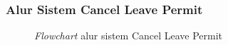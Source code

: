 \subsubsection{Alur Sistem Cancel Leave Permit}
\begin{figure}[H]
    \centering
    \caption{\textit{Flowchart} alur sistem Cancel Leave Permit}
    \label{fig:flowchart_cancel_leave_permit}
\end{figure}

